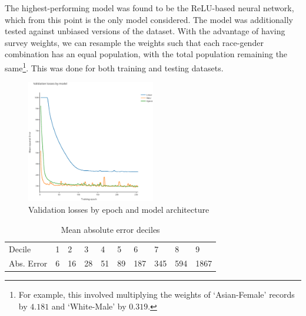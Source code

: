 \documentclass[conference]{IEEEtran}
\begin{document}
The highest-performing model was found to be the ReLU-based neural network, which from this point is the only model considered. The model was additionally tested against unbiased versions of the dataset. With the advantage of having survey weights, we can resample the weights such that each race-gender combination has an equal population, with the total population remaining the same\footnote{For example, this involved multiplying the weights of `Asian-Female' records by $4.181$ and `White-Male' by $0.319$.}. This was done for both training and testing datasets.

\begin{figure}[h]
    \caption{Validation losses by epoch and model architecture}
    \centering
    \includegraphics[width=0.5\textwidth]{figures/losses.eps}
\end{figure}

\begin{table}[]
    \caption{Mean absolute error deciles}
    \centering
    \begin{tabular}{llllllllll}
    Decile     & 1    & 2     & 3     & 4     & 5     & 6      & 7      & 8      & 9       \\
    Abs. Error & 6 & 16 & 28 & 51 & 89 & 187 & 345 & 594 & 1867
    \end{tabular}
\end{table}



\end{document}
